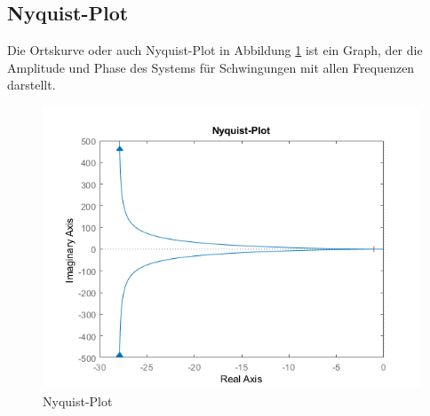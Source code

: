 \subsection{Nyquist-Plot}

Die Ortskurve oder auch Nyquist-Plot in Abbildung \ref{fig:nyquist-plot} ist ein Graph, der die Amplitude und Phase des Systems für Schwingungen mit allen Frequenzen darstellt.

\begin{figure}[H]
	\centering
	\includegraphics[width=0.7\linewidth]{diagrams/nyquistDiagram.png}
	\caption[Nyquist-Plot]{Nyquist-Plot}
	\label{fig:nyquist-plot}
\end{figure}